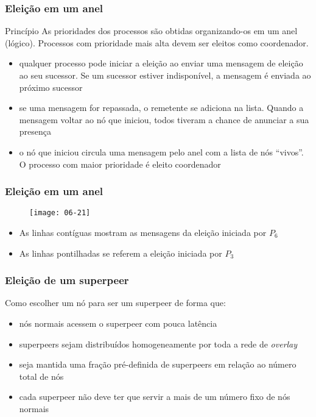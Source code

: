 \documentclass[Ligatures=TeX,table,brazil,svgnames,usetotalslideindicator,compress,10pt]{beamer}
\begin{document}
\begin{frame}
  \frametitle{Eleição em um anel}
  \begin{block}{Princípio}
    As prioridades dos processos são obtidas organizando-os em um anel
    (lógico). Processos com prioridade mais alta devem ser eleitos
    como coordenador.
  \end{block}

  \begin{itemize}
  \item qualquer processo pode iniciar a eleição ao enviar uma
    mensagem de eleição ao seu sucessor. Se um sucessor estiver
    indisponível, a mensagem é enviada ao próximo sucessor
  \item se uma mensagem for repassada, o remetente se adiciona na
    lista. Quando a mensagem voltar ao nó que iniciou, todos tiveram a
    chance de anunciar a sua presença
  \item o nó que iniciou circula uma mensagem pelo anel com a lista de
    nós ``vivos''. O processo com maior prioridade é eleito
    coordenador
  \end{itemize}

\end{frame}

\begin{frame}
  \frametitle{Eleição em um anel}

    \begin{figure}
      \centering
      \texttt{[image: 06-21]}
    \end{figure}

    \begin{itemize}
    \item As linhas contíguas mostram as mensagens da eleição iniciada por $P_6$
    \item As linhas pontilhadas se referem a eleição iniciada por $P_3$
    \end{itemize}

\end{frame}

\begin{frame}
  \frametitle{Eleição de um superpeer}
  Como escolher um nó para ser um \alert{superpeer} de forma que:

  \begin{itemize}
  \item nós normais acessem o superpeer com pouca latência
  \item superpeers sejam distribuídos homogeneamente por toda a rede de \textit{overlay}
  \item seja mantida uma fração pré-definida de superpeers em relação ao número total de nós
  \item cada superpeer não deve ter que servir a mais de um número fixo de nós normais
  \end{itemize}
\end{frame}
\end{document}
